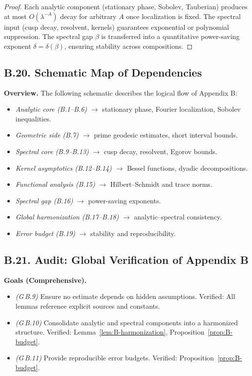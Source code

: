 \begin{proof}
Each analytic component (stationary phase, Sobolev, Tauberian) produces at most $O(\lambda^{-A})$ decay for arbitrary $A$ once localization is fixed. The spectral input (cusp decay, resolvent, kernels) guarantees exponential or polynomial suppression. The spectral gap $\beta$ is transferred into a quantitative power-saving exponent $\delta=\delta(\beta)$, ensuring stability across compositions. 
\end{proof}

\subsection*{B.20. Schematic Map of Dependencies}

\noindent
\textbf{Overview.}  
The following schematic describes the logical flow of Appendix B:

\begin{itemize}
  \item \emph{Analytic core (B.1--B.6)} $\rightarrow$ stationary phase, Fourier localization, Sobolev inequalities.  
  \item \emph{Geometric side (B.7)} $\rightarrow$ prime geodesic estimates, short interval bounds.  
  \item \emph{Spectral core (B.9--B.13)} $\rightarrow$ cusp decay, resolvent, Egorov bounds.  
  \item \emph{Kernel asymptotics (B.12--B.14)} $\rightarrow$ Bessel functions, dyadic decompositions.  
  \item \emph{Functional analysis (B.15)} $\rightarrow$ Hilbert–Schmidt and trace norms.  
  \item \emph{Spectral gap (B.16)} $\rightarrow$ power-saving exponents.  
  \item \emph{Global harmonization (B.17--B.18)} $\rightarrow$ analytic–spectral consistency.  
  \item \emph{Error budget (B.19)} $\rightarrow$ stability and reproducibility.  
\end{itemize}

\subsection*{B.21. Audit: Global Verification of Appendix B}

\noindent
\textbf{Goals (Comprehensive).}
\begin{itemize}
  \item \emph{(G\,B.9)} Ensure no estimate depends on hidden assumptions.  
  Verified: All lemmas reference explicit sources and constants.  
  \item \emph{(G\,B.10)} Consolidate analytic and spectral components into a harmonized structure.  
  Verified: Lemma~\ref{lem:B-harmonization}, Proposition~\ref{prop:B-budget}.  
  \item \emph{(G\,B.11)} Provide reproducible error budgets.  
  Verified: Proposition~\ref{prop:B-budget}.  
\end{itemize}


